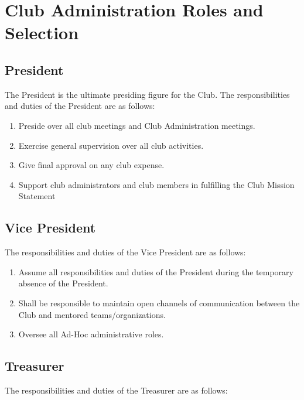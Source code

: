 \documentclass[english,11pt]{article}
\begin{document}
\section{Club Administration Roles and Selection} \label{act:cadmin}
\subsection{President} \label{sect:cadmin:president}
The President is the ultimate presiding figure for the Club.
The responsibilities and duties of the President are as follows:

\begin{enumerate}[label=\Alph*.]
\item Preside over all club meetings and Club Administration meetings.
\item Exercise general supervision over all club activities.
\item Give final approval on any club expense.
\item Support club administrators and club members in fulfilling the Club Mission Statement
\end{enumerate}

\subsection{Vice President} \label{sect:cadmin:vicepresident}
The responsibilities and duties of the Vice President are as follows:

\begin{enumerate}[label=\Alph*.]	
\item Assume all responsibilities and duties of the President during the temporary absence of the President.
\item Shall be responsible to maintain open channels of communication between the Club and mentored teams/organizations.
\item Oversee all Ad-Hoc administrative roles.
\end{enumerate}

\subsection{Treasurer} \label{sect:cadmin:treasurer}
The responsibilities and duties of the Treasurer are as follows:
\end{document}
